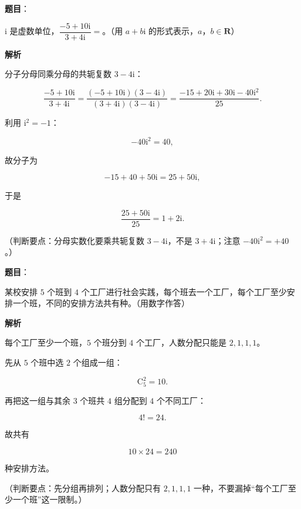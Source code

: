 \begin{answer}

\textbf{题目}：

$\mathrm i$ 是虚数单位，$\dfrac{-5+10\mathrm i}{3+4\mathrm i}=$\gkblank{}。（用 $a+b\mathrm i$ 的形式表示，$a$，$b\in\mathbf R$）

\textbf{解析}

分子分母同乘分母的共轭复数 $3-4\mathrm i$：

\nopagebreak[4]
\[\frac{-5+10\mathrm i}{3+4\mathrm i}=\frac{(-5+10\mathrm i)(3-4\mathrm i)}{(3+4\mathrm i)(3-4\mathrm i)}=\frac{-15+20\mathrm i+30\mathrm i-40\mathrm i^2}{25}.\]

利用 $\mathrm i^2=-1$：

\nopagebreak[4]
\[-40\mathrm i^2=40,\]

故分子为

\nopagebreak[4]
\[-15+40+50\mathrm i=25+50\mathrm i,\]

于是

\nopagebreak[4]
\[\frac{25+50\mathrm i}{25}=1+2\mathrm i.\]

（判断要点：分母实数化要乘共轭复数 $3-4\mathrm i$，不是 $3+4\mathrm i$；注意 $-40\mathrm i^2=+40$。）


\end{answer}
\begin{answer}

\textbf{题目}：

某校安排 $5$ 个班到 $4$ 个工厂进行社会实践，每个班去一个工厂，每个工厂至少安排一个班，不同的安排方法共有\gkblank{}种。（用数字作答）

\textbf{解析}

每个工厂至少一个班，$5$ 个班分到 $4$ 个工厂，人数分配只能是 $2,1,1,1$。

先从 $5$ 个班中选 $2$ 个组成一组：

\nopagebreak[4]
\[\mathrm C_5^2=10.\]

再把这一组与其余 $3$ 个班共 $4$ 组分配到 $4$ 个不同工厂：

\nopagebreak[4]
\[4!=24.\]

故共有

\nopagebreak[4]
\[10\times24=240\]

种安排方法。

（判断要点：先分组再排列；人数分配只有 $2,1,1,1$ 一种，不要漏掉“每个工厂至少一个班”这一限制。）


\end{answer}
